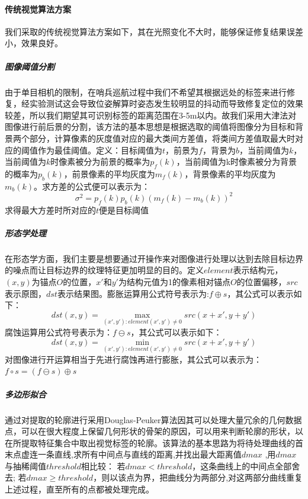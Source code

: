 \paragraph{传统视觉算法方案} 我们采取的传统视觉算法方案如下，其在光照变化不大时，能够保证修复结果误差小，效果良好。

\subparagraph{图像阈值分割}
由于单目相机的限制，在哨兵巡航过程中我们不希望其根据远处的标签来进行修复，经实验测试这会导致位姿解算时姿态发生较明显的抖动而导致修复定位的效果较差，所以我们期望其可识别标签的距离范围在3-5m以内。故我们采用大津法对图像进行前后景的分割，该方法的基本思想是根据选取的阈值将图像分为目标和背景两个部分，计算像素的灰度值对应的最大类间方差值，将类间方差值取最大时对应的阈值作为最佳阈值。定义：目标阈值为$t$，前景为$f$，背景为$b$，当前阈值为$k$，当前阈值为$k$时像素被分为前景的概率为$p_f\left(k\right)$，当前阈值为k时像素被分为背景的概率为$p_b\left(k\right)$，前景像素的平均灰度为$m_f\left(k\right)$，背景像素的平均灰度为$m_b\left(k\right)$。求方差的公式便可以表示为：
\begin{equation}
    \sigma^2 = p_f(k)p_b(k)(m_f(k) - m_b(k))^2
\end{equation}
求得最大方差时所对应的$t$便是目标阈值

\subparagraph{形态学处理}
在形态学方面，我们主要是想要通过开操作来对图像进行处理以达到去除目标边界的噪点而让目标边界的纹理特征更加明显的目的。定义$element$表示结构元，$(x,y)$为锚点$O$的位置，$x'$和$y'$为结构元值为1的像素相对锚点$O$的位置偏移，$src$表示原图，$dst$表示结果图。膨胀运算用公式符号表示为:$f \oplus s$，其公式可以表示如下：
\begin{equation}
    dst(x,y) = \max\limits_{(x',y'):element(x',y')\ne0}src(x+x',y+y')
\end{equation}
腐蚀运算用公式符号表示为：$f \ominus s$，其公式可以表示如下：
\begin{equation}
    dst(x,y) = \min\limits_{(x',y'):element(x',y')\ne0}src(x+x',y+y')
\end{equation}
对图像进行开运算相当于先进行腐蚀再进行膨胀，其公式可以表示为：$f \circ s=(f \ominus s) \oplus s$

\subparagraph{多边形拟合}
通过对提取的轮廓进行采用Douglas-Peuker算法因其可以处理大量冗余的几何数据点，可以在很大程度上保留几何形状的骨架的原因，可以用来判断轮廓的形状，以在所提取特征集合中取出视觉标签的轮廓。该算法的基本思路为将待处理曲线的首末点虚连一条直线,求所有中间点与直线的距离,并找出最大距离值$dmax$ ,用$dmax$与抽稀阈值$threshold$相比较：
若$dmax < threshold$，这条曲线上的中间点全部舍去;
若$dmax \geq threshold$，则以该点为界，把曲线分为两部分,对这两部分曲线重复上述过程，直至所有的点都被处理完成。

